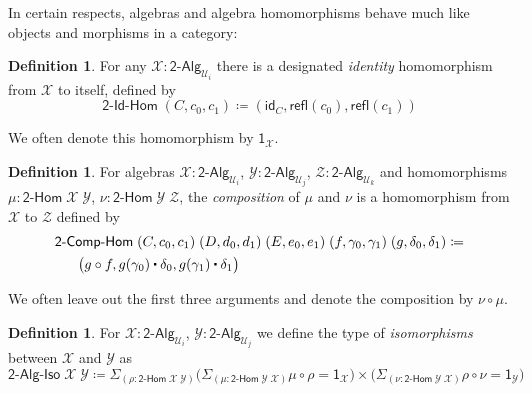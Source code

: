 \documentclass[11pt]{article}
\newcommand{\X}{\mathcal{X}}
\newcommand{\Y}{\mathcal{Y}}
\newcommand{\Z}{\mathcal{Z}}
\newcommand{\comp}{\circ}
\newcommand{\idfun}[1]{\mathsf{id}_{#1}}
\newcommand{\sm}[1]{\Sigma_{#1}}
\newcommand{\defeq}{\coloneqq}
\newcommand{\refl}{\mathsf{refl}}
\newcommand{\one}{\mathsf{1}}
\newcommand{\UU}{\mathcal{U}}
\newcommand{\BoolAlg}{\mathsf{2}\text{-}\mathsf{Alg}}
\newcommand{\BoolHom}{\mathsf{2}\text{-}\mathsf{Hom}}
\newcommand{\BoolIdHom}{\mathsf{2}\text{-}\mathsf{Id}\text{-}\mathsf{Hom}}
\newcommand{\BoolCompHom}{\mathsf{2}\text{-}\mathsf{Comp}\text{-}\mathsf{Hom}}
\newcommand{\BoolAlgIso}{\mathsf{2}\text{-}\mathsf{Alg}\text{-}\mathsf{Iso}}
\newcommand{\ct}{%
  \mathchoice{\mathbin{\raisebox{0.5ex}{$\displaystyle\centerdot$}}}%
             {\mathbin{\raisebox{0.5ex}{$\centerdot$}}}%
             {\mathbin{\raisebox{0.25ex}{$\scriptstyle\,\centerdot\,$}}}%
             {\mathbin{\raisebox{0.1ex}{$\scriptscriptstyle\,\centerdot\,$}}}}
\theoremstyle{definition}
\newtheorem{definition}[theorem]{Definition}
\begin{document}
In certain respects, algebras and algebra homomorphisms behave much like objects and morphisms in a category:
\begin{definition}
For any $\X : \BoolAlg_{\UU_i}$ there is a designated \emph{identity} homomorphism from $\X$ to itself, defined by
\[ \BoolIdHom \; (C,c_0,c_1) \defeq (\idfun{C}, \refl(c_0), \refl(c_1)) \]
\end{definition}
We often denote this homomorphism by $\one_\X$.

\begin{definition}
For algebras $\X : \BoolAlg_{\UU_i}$, $\Y : \BoolAlg_{\UU_j}$, $\Z : \BoolAlg_{\UU_k}$ and homomorphisms $\mu : \BoolHom \; \X \; \Y$, $\nu : \BoolHom \; \Y \; \Z$, the \emph{composition} of $\mu$ and $\nu$ is a homomorphism from $\X$ to $\Z$ defined by
\begin{align*} & \BoolCompHom \; (C,c_0,c_1) \; (D,d_0,d_1) \; (E,e_0,e_1) \; (f,\gamma_0,\gamma_1) \; (g,\delta_0,\delta_1) \defeq \\ & \;\;\;\;\;\; \big(g \comp f, g(\gamma_0) \ct \delta_0, g(\gamma_1) \ct \delta_1\big)
\end{align*}
\end{definition}
We often leave out the first three arguments and denote the composition by $\nu \comp \mu$.

\begin{definition}
For $\X : \BoolAlg_{\UU_i}$, $\Y : \BoolAlg_{\UU_j}$ we define the type of \emph{isomorphisms} between $\X$ and $\Y$ as
\[\BoolAlgIso \; \X \; \Y \defeq \sm{(\rho : \BoolHom \; \X \; \Y)} \Big( \sm{(\mu : \BoolHom \; \Y \; \X)} \mu \comp \rho = \one_\X \Big) \times \Big( \sm{(\nu : \BoolHom \; \Y \; \X)} \rho \comp \nu = \one_\Y \Big) \] 
\end{definition}
\end{document}
